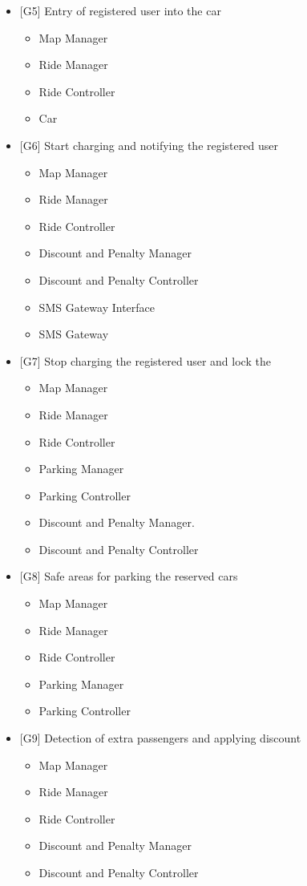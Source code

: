 \begin{itemize}
	\item {[}G5{]} Entry of registered user into the car
	\begin{itemize}
		\item Map Manager
		\item Ride Manager
		\item Ride Controller
		\item Car
	\end{itemize}

	\item {[}G6{]} Start charging and notifying the registered user
	\begin{itemize}
		\item Map Manager
		\item Ride Manager
		\item Ride Controller
		\item Discount and Penalty Manager
		\item Discount and Penalty Controller
		\item SMS Gateway Interface
		\item SMS Gateway
	\end{itemize}

	\item {[}G7{]} Stop charging the registered user and lock the
	\begin{itemize}
		\item Map Manager
		\item Ride Manager
		\item Ride Controller
		\item Parking Manager
		\item Parking Controller
		\item Discount and Penalty Manager.
		\item Discount and Penalty Controller
	\end{itemize}

	\item {[}G8{]} Safe areas for parking the reserved cars
	\begin{itemize}
		\item Map Manager
		\item Ride Manager
		\item Ride Controller
		\item Parking Manager
		\item Parking Controller
	\end{itemize}

	\item {[}G9{]} Detection of extra passengers and applying discount
	\begin{itemize}
		\item Map Manager
		\item Ride Manager
		\item Ride Controller
		\item Discount and Penalty Manager
		\item Discount and Penalty Controller
	\end{itemize}


\end{itemize}
